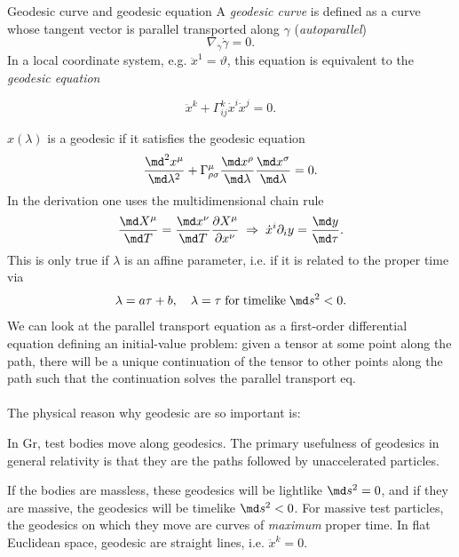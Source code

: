 \begin{mybox}{Geodesic curve and geodesic equation}
	A \emph{geodesic curve} is defined as a curve whose tangent vector is parallel transported along $\gamma$ (\emph{autoparallel})	
	\begin{equation}
	\nabla_{\dot{\gamma}} \dot{\gamma} = 0.
	\end{equation}
	In a local coordinate system, e.g. $\ddot{x}^1 = \vartheta$, this equation is equivalent to the \emph{geodesic equation}
	
	\begin{equation}
	\label{eq:geodesicequation}
	\ddot{x}^k + \Gamma^k_{ij} \dot{x}^i \dot{x}^j = 0.
	\end{equation}
	
	$x(\lambda)$ is a geodesic if it satisfies the geodesic equation 
	\begin{equation}
		\frac{\md^2 x^{\mu}}{\md \lambda^2} + \Gamma^{\mu}_{\rho \sigma} \frac{\md x^{\rho}}{\md \lambda} \frac{\md x^{\sigma}}{\md \lambda} = 0.
	\end{equation}
	In the derivation one uses the multidimensional chain rule
	\begin{equation}
		\frac{\md X^\mu}{\md T} = \frac{\md x^\nu}{\md T} \frac{\partial X^\mu}{\partial x^\nu} \;\Rightarrow\; \dot{x}^i\partial_i y = \frac{\md y}{\md \tau}.
	\end{equation}
	This is only true if $\lambda$ is an affine parameter, i.e. if it is related to the proper time via
	\begin{equation}
		\lambda = a \tau +b, \quad \lambda = \tau \; \mathrm{ for \; timelike} \; \md s^2 < 0.
	\end{equation}
	We can look at the parallel transport equation as a first-order differential equation defining
	an initial-value problem: given a tensor at some point along the path, there will be a unique
	continuation of the tensor to other points along the path such that the continuation solves the parallel transport eq.\\
	\\
	The physical reason why geodesic are so important is:
	\begin{statements}
		In Gr, test bodies move along geodesics. The primary usefulness of geodesics in general relativity is that they are the paths followed by unaccelerated particles.
	\end{statements}
If the bodies are massless, these geodesics will be lightlike $\md s^2=0$, and if they are massive, the geodesics will be timelike $\md s^2 < 0$.
For massive test particles, the geodesics on which they move are curves of \emph{maximum} proper time.
	In flat Euclidean space, geodesic are straight lines, i.e. $\ddot{x}^k =0$.
	\end{mybox}
